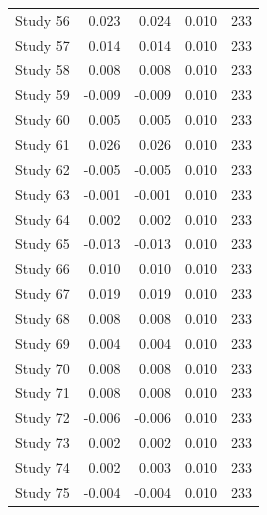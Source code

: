 \begin{table}[!h]
{\begin{tabular}[t]{rrrrr}
\hspace{1em}Study 56 & 0.023 & 0.024 & 0.010 & 233\\
\hspace{1em}Study 57 & 0.014 & 0.014 & 0.010 & 233\\
\hspace{1em}Study 58 & 0.008 & 0.008 & 0.010 & 233\\
\hspace{1em}Study 59 & -0.009 & -0.009 & 0.010 & 233\\
\hspace{1em}Study 60 & 0.005 & 0.005 & 0.010 & 233\\
\hspace{1em}Study 61 & 0.026 & 0.026 & 0.010 & 233\\
\hspace{1em}Study 62 & -0.005 & -0.005 & 0.010 & 233\\
\hspace{1em}Study 63 & -0.001 & -0.001 & 0.010 & 233\\
\hspace{1em}Study 64 & 0.002 & 0.002 & 0.010 & 233\\
\hspace{1em}Study 65 & -0.013 & -0.013 & 0.010 & 233\\
\hspace{1em}Study 66 & 0.010 & 0.010 & 0.010 & 233\\
\hspace{1em}Study 67 & 0.019 & 0.019 & 0.010 & 233\\
\hspace{1em}Study 68 & 0.008 & 0.008 & 0.010 & 233\\
\hspace{1em}Study 69 & 0.004 & 0.004 & 0.010 & 233\\
\hspace{1em}Study 70 & 0.008 & 0.008 & 0.010 & 233\\
\hspace{1em}Study 71 & 0.008 & 0.008 & 0.010 & 233\\
\hspace{1em}Study 72 & -0.006 & -0.006 & 0.010 & 233\\
\hspace{1em}Study 73 & 0.002 & 0.002 & 0.010 & 233\\
\hspace{1em}Study 74 & 0.002 & 0.003 & 0.010 & 233\\
\hspace{1em}Study 75 & -0.004 & -0.004 & 0.010 & 233\\

\end{tabular}}
\end{table}

